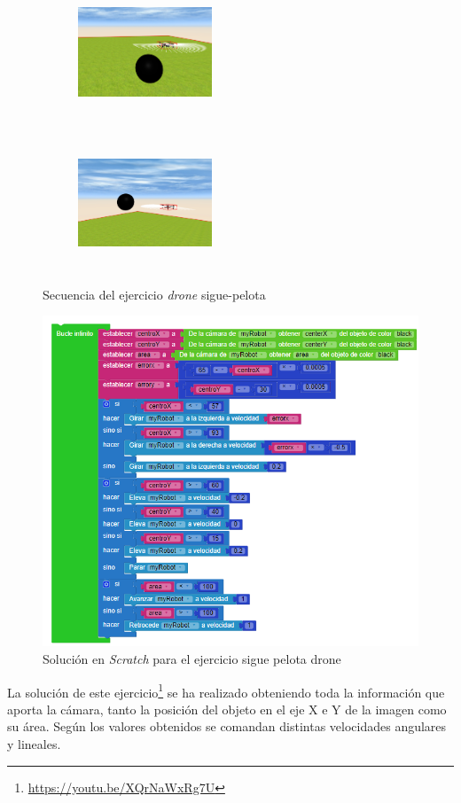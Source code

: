 \begin{figure}[H]
\begin{subfigure}[t]{0.3\textwidth}
\end{subfigure}\hfill
\begin{subfigure}[t]{0.3\textwidth}
    \includegraphics[width=4cm, height=4cm]{img/followBallTello52.png}
\label{fig:figure2_7}
\end{subfigure}\hfill
\begin{subfigure}[t]{0.3\textwidth}
    \includegraphics[width=4cm, height=4cm]{img/followBallTello62.png}
\label{fig:figure2_8}
\end{subfigure}

\caption{Secuencia del ejercicio \textit{drone} sigue-pelota}
\label{fig:secuenciaDrone}
\end{figure}


    \begin{figure}[h]
    \centering
    \includegraphics[scale=0.9]{img/siguepelotacodigo.png}
    \caption{Solución en \textit{Scratch} para el ejercicio sigue pelota drone} 
    \label{fig:pelotaSolution}
    \end{figure}
    La solución de este ejercicio\footnote{\url{https://youtu.be/XQrNaWxRg7U}} se ha realizado obteniendo toda la información que aporta la cámara, tanto la posición del objeto en el eje X e Y de la imagen como su área. Según los valores obtenidos se comandan distintas velocidades angulares y lineales. 
